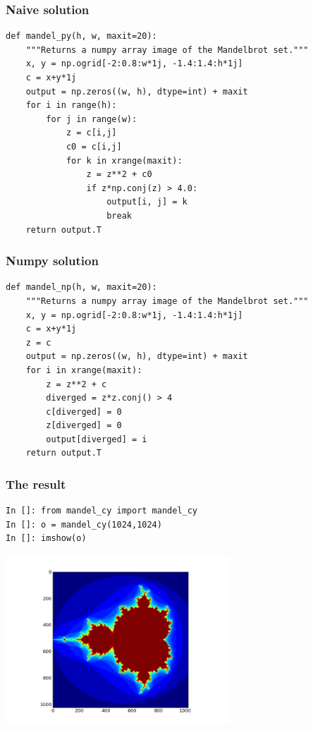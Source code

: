 \documentclass[14pt,compress]{beamer}
\begin{document}
\begin{frame}
    \small
    \vspace*{-0.25in}
  \frametitle{Naive solution}
  \begin{lstlisting}
def mandel_py(h, w, maxit=20):
    """Returns a numpy array image of the Mandelbrot set."""
    x, y = np.ogrid[-2:0.8:w*1j, -1.4:1.4:h*1j]
    c = x+y*1j
    output = np.zeros((w, h), dtype=int) + maxit
    for i in range(h):
        for j in range(w):
            z = c[i,j]
            c0 = c[i,j]
            for k in xrange(maxit):
                z = z**2 + c0
                if z*np.conj(z) > 4.0:
                    output[i, j] = k
                    break
    return output.T
  \end{lstlisting}
\end{frame}

\begin{frame}
  \frametitle{Numpy solution}
  \small
  \begin{lstlisting}
def mandel_np(h, w, maxit=20):
    """Returns a numpy array image of the Mandelbrot set."""
    x, y = np.ogrid[-2:0.8:w*1j, -1.4:1.4:h*1j]
    c = x+y*1j
    z = c
    output = np.zeros((w, h), dtype=int) + maxit
    for i in xrange(maxit):
        z = z**2 + c
        diverged = z*z.conj() > 4
        c[diverged] = 0
        z[diverged] = 0
        output[diverged] = i
    return output.T
  \end{lstlisting}
\end{frame}

\begin{frame}
    \frametitle{The result}
\begin{lstlisting}
In []: from mandel_cy import mandel_cy
In []: o = mandel_cy(1024,1024)
In []: imshow(o)
\end{lstlisting}
\vspace*{-1em}
\begin{center}
    \includegraphics[height=2.5in]{data/mandelbrot}
\end{center}
\end{frame}
\end{document}
